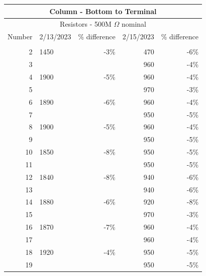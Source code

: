 \documentclass{scrartcl}
\begin{document}
\centering
\begin{longtable}{|r|l|r|r|r|}
	\hline
	\multicolumn{5}{|c|}{\Large Column - Bottom to Terminal} \\
	\hline
	\multicolumn{5}{|c|}{Resistors - 500M $\Omega$ nominal} \\
	\hline
	\multicolumn{1}{|l|}{Number} & 2/13/2023 & \% difference & 2/15/2023 & \% difference	\\
	\hline
	\endhead
	\hline
	\endfoot
    1     &       &       &       &  \\
    2     & 1450  & -3\%  & 470   & \cellcolor[rgb]{ 1,  .922,  .612}\textcolor[rgb]{ .612,  .341,  0}{-6\%} \\
    3     &       &       & 960   & -4\% \\
    4     & 1900  & -5\%  & 960   & -4\% \\
    5     &       &       & 970   & -3\% \\
    6     & 1890  & -6\%  & 960   & -4\% \\
    7     &       &       & 950   & -5\% \\
    8     & 1900  & -5\%  & 960   & -4\% \\
    9     &       &       & 950   & -5\% \\
    10    & 1850  & \cellcolor[rgb]{ 1,  .922,  .612}\textcolor[rgb]{ .612,  .341,  0}{-8\%} & 950   & -5\% \\
    11    &       &       & 950   & -5\% \\
    12    & 1840  & \cellcolor[rgb]{ 1,  .922,  .612}\textcolor[rgb]{ .612,  .341,  0}{-8\%} & 940   & \cellcolor[rgb]{ 1,  .922,  .612}\textcolor[rgb]{ .612,  .341,  0}{-6\%} \\
    13    &       &       & 940   & \cellcolor[rgb]{ 1,  .922,  .612}\textcolor[rgb]{ .612,  .341,  0}{-6\%} \\
    14    & 1880  & \cellcolor[rgb]{ 1,  .922,  .612}\textcolor[rgb]{ .612,  .341,  0}{-6\%} & 920   & \cellcolor[rgb]{ 1,  .922,  .612}\textcolor[rgb]{ .612,  .341,  0}{-8\%} \\
    15    &       &       & 970   & -3\% \\
    16    & 1870  & \cellcolor[rgb]{ 1,  .922,  .612}\textcolor[rgb]{ .612,  .341,  0}{-7\%} & 960   & -4\% \\
    17    &       &       & 960   & -4\% \\
    18    & 1920  & -4\%  & 950   & -5\% \\
    19    &       &       & 950   & -5\% \\

\end{longtable}
\end{document}
